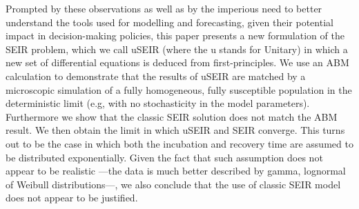 \documentclass[a4paper,oneside,11pt]{article}
\begin{document}
Prompted by these observations as well as by the imperious need to better understand the tools used for modelling and forecasting, given their potential impact in decision-making policies, this paper presents a new formulation of the SEIR problem, which we call uSEIR (where the u stands for Unitary) in which a new set of differential equations is deduced from first-principles. We use an ABM calculation to demonstrate that the results of uSEIR are matched by a microscopic simulation of a fully homogeneous, fully susceptible population in the deterministic limit (e.g, with no stochasticity in the model parameters). Furthermore we show that the classic SEIR solution does not match the ABM result. We then obtain the limit in which uSEIR and SEIR converge. This turns out to be the case in which both the incubation and recovery time are assumed to be distributed exponentially. Given the fact that such assumption does not appear to be realistic ---the data is much better described by gamma, lognormal of Weibull distributions---, we also conclude that the use of classic SEIR model does not appear to be justified. 
\end{document}
